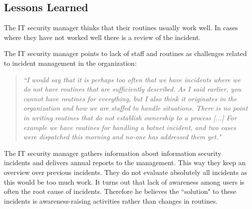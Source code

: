 \subsection{Lessons Learned}
The IT security manager thinks that their routines usually work well. In cases where they have not worked well there is a review of the incident.


The IT security manager points to lack of staff and routines as challenges related to incident management in the organization: 

\begin{quote}
\textit{``I would say that it is perhaps too often that we have incidents where we do not have routines that are sufficiently described. %
As I said earlier, you cannot have routines for everything, but I also think it originates in the organization and how we are staffed to handle situations. There is no point in writing routines that do not establish ownership to a process [...] For example we have routines for handling a botnet incident, and two cases were dispatched this morning and no-one has addressed them yet."}
\end{quote}

The IT security manager gathers information about information security incidents and delivers annual reports to the management. This way they keep an overview over previous incidents. They do not evaluate absolutely all incidents as this would be too much work. It turns out that lack of awareness among users is often the root cause of incidents. Therefore he believes the ``solution" to these incidents is awareness-raising activities rather than changes in routines.

